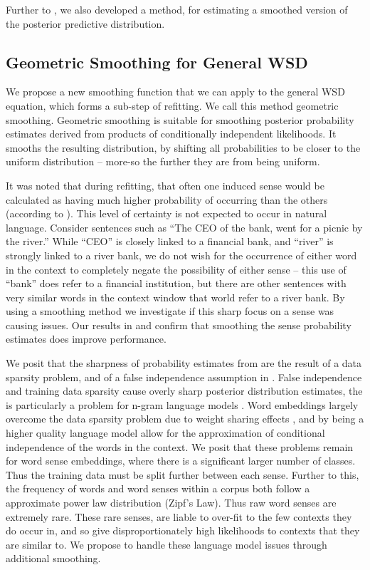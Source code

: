 \documentclass{sig-alternate}
\begin{document}
Further to , we also developed a method, for estimating a smoothed version of the posterior predictive distribution.


\subsection{Geometric Smoothing for General WSD} \label{smoothing}
We propose a new smoothing function that we can apply to the general WSD equation, which forms a sub-step of refitting.
We call this method geometric smoothing.
Geometric smoothing is suitable for smoothing posterior probability estimates derived from products of conditionally independent likelihoods.
It smooths the resulting distribution, by shifting all probabilities to be closer to the uniform distribution -- more-so the further they are from being uniform.

It was noted that during refitting, that often one induced sense would be calculated as having much higher probability of occurring than the others (according to ). This level of certainty is not expected to occur in natural language. Consider sentences such as \enquote{The CEO of the bank, went for a picnic by the river.} While \enquote{CEO} is closely linked to a financial bank, and \enquote{river} is strongly linked to a river bank, we do not wish for the occurrence of either word in the context to completely negate the possibility of either sense -- this use of \enquote{bank} does refer to a financial institution, but there are other sentences with very similar words in the context window that world refer to a river bank.
By using a smoothing method we investigate if this sharp focus on a sense was causing issues.
Our results in  and  confirm that smoothing the sense probability estimates does improve performance.


We posit that the sharpness of probability estimates from  are the result of a data sparsity problem, and of a false independence assumption in . False independence and training data sparsity cause overly sharp posterior distribution estimates, the is particularly a problem for n-gram language models \cite{rosenfeld2000two}.
Word  embeddings largely overcome the data sparsity problem due to weight sharing effects \parencite{NPLM},  and by being a higher quality language model allow for the approximation of conditional independence of the words in the context.
We posit that these problems remain for word sense embeddings, where there is a significant larger number of classes.
Thus the training data must be split further between each sense. 
Further to this, the frequency of words \parencite{zipf1949human}  and word senses \parencite{Kilgarriff2004} within a corpus both follow a approximate power law distribution (Zipf's Law).
Thus raw word senses are extremely rare.
These rare senses, are liable to over-fit to the few contexts they do occur in, and so give disproportionately high likelihoods to contexts that they are similar to.
We propose to handle these language model issues through additional smoothing.
\end{document}

